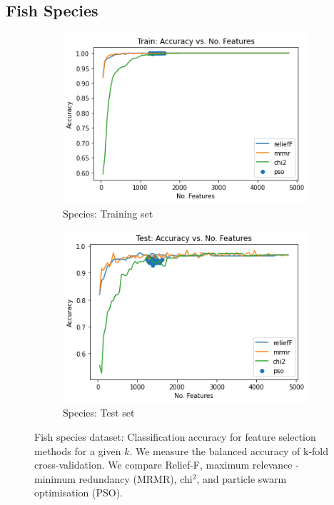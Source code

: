 \documentclass[runningheads]{llncs}
\begin{document}

\subsection{Fish Species}

\begin{figure}[htb]
  \centering
  \begin{subfigure}[b]{.55\linewidth}
    \includegraphics[width=\linewidth]{accuracy-features-fish-train.png}
    \caption{Species: Training set}\label{fig:accuracy-features-fish-train}
  \end{subfigure}
  \begin{subfigure}[b]{.55\linewidth}
    \includegraphics[width=\linewidth]{accuracy-features-fish-test.png}
    \caption{Species: Test set}\label{fig:accuracy-features-fish-test}
  \end{subfigure}
  \caption[Two numerical solutions]{
    Fish species dataset: Classification accuracy for feature selection methods for a given $k$.
    We measure the balanced accuracy of k-fold cross-validation.
    We compare Relief-F, maximum relevance - minimum redundancy (MRMR), chi$^2$, and particle swarm optimisation (PSO).
    }
  \label{fig:animals}
\end{figure}
\end{document}
